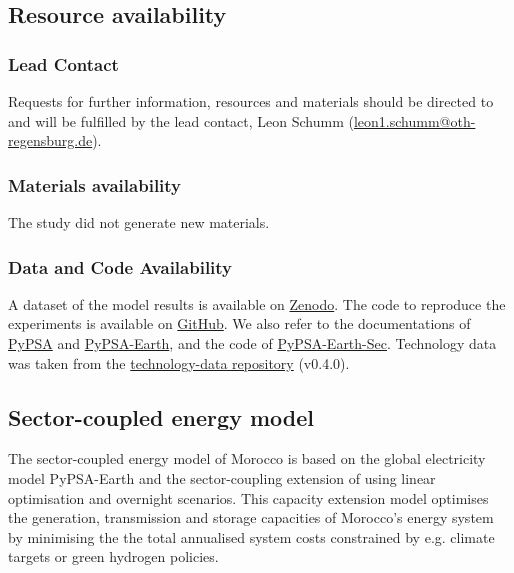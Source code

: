 

\subsection*{Resource availability}

\subsubsection*{Lead Contact}

Requests for further information, resources and materials should be directed to and will be fulfilled by the lead contact, Leon Schumm
(\href{mailto:leon1.schumm@oth-regensburg.de}{leon1.schumm@oth-regensburg.de}).

\subsubsection*{Materials availability}
The study did not generate new materials.



\subsubsection*{Data and Code Availability}

A dataset of the model results is available on \href{https://doi.org/10.5281/zenodo.10951650}{Zenodo}. The code to reproduce the experiments is available on \href{https://github.com/energyLS/aldehyde}{GitHub}.
We also refer to the documentations of \href{https://pypsa.readthedocs.io}{PyPSA} and  \href{https://pypsa-earth.readthedocs.io}{PyPSA-Earth}, and the code of 
\href{https://github.com/pypsa-meets-earth/pypsa-earth-sec}{PyPSA-Earth-Sec}.
Technology data was taken from the
\href{https://github.com/pypsa/technology-data}{technology-data repository} (v0.4.0).




\subsection*{Sector-coupled energy model}
\label{subsec:moroccan_model}
The sector-coupled energy model of Morocco is based on the global electricity model  PyPSA-Earth \cite{Parzen2023} and the sector-coupling extension of \cite{Abdel-Khalek2024} using linear optimisation and overnight scenarios. This capacity extension model optimises the generation, transmission and storage capacities of Morocco's energy system by minimising the the total annualised system costs constrained by e.g. climate targets or green hydrogen policies.

